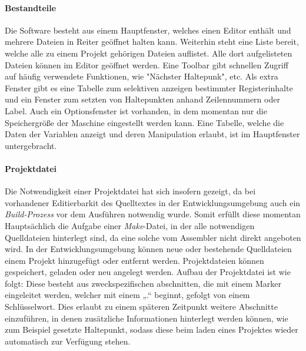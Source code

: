 \paragraph{Bestandteile}
Die Software besteht aus einem Hauptfenster, welches einen Editor enthält und mehrere Dateien in Reiter geöffnet halten kann. Weiterhin steht eine Liste bereit, welche alle zu einem Projekt gehörigen Dateien auflistet. Alle dort aufgelisteten Dateien können im Editor geöffnet werden. Eine Toolbar gibt schnellen Zugriff auf häufig verwendete Funktionen, wie "Nächster Haltepunk", etc.
Als extra Fenster gibt es eine Tabelle zum selektiven anzeigen bestimmter Registerinhalte und ein Fenster zum setzten von Haltepunkten anhand Zeilennummern oder Label. Auch ein Optionsfenster ist vorhanden, in dem momentan nur die Speichergröße der Maschine eingestellt werden kann. Eine Tabelle, welche die Daten der Variablen anzeigt und deren Manipulation erlaubt, ist im Hauptfenster untergebracht.

\paragraph{Projektdatei}
Die Notwendigkeit einer Projektdatei hat sich insofern gezeigt, da bei vorhandener Editierbarkit des Quelltextes in der Entwicklungsumgebung auch ein \emph{Build-Prozess} vor dem Ausführen notwendig wurde. Somit erfüllt diese momentan Hauptsächlich die Aufgabe einer \emph{Make}-Datei, in der alle notwendigen Quelldateien hinterlegt sind, da eine solche vom Assembler nicht direkt angeboten wird. In der Entwicklungsumgebung können neue oder bestehende Quelldateien einem Projekt hinzugefügt oder entfernt werden. Projektdateien können gespeichert, geladen oder neu angelegt werden.  Aufbau der Projektdatei ist wie folgt: Diese besteht aus zweckspezifischen abschnitten, die mit einem Marker eingeleitet werden, welcher mit einem „.“ beginnt, gefolgt von einem Schlüsselwort. Dies erlaubt zu einem späteren Zeitpunkt weitere Abschnitte einzuführen, in denen zusätzliche Informationen hinterlegt werden können, wie zum Beispiel gesetzte Haltepunkt, sodass diese beim laden eines Projektes wieder automatisch zur Verfügung stehen.

